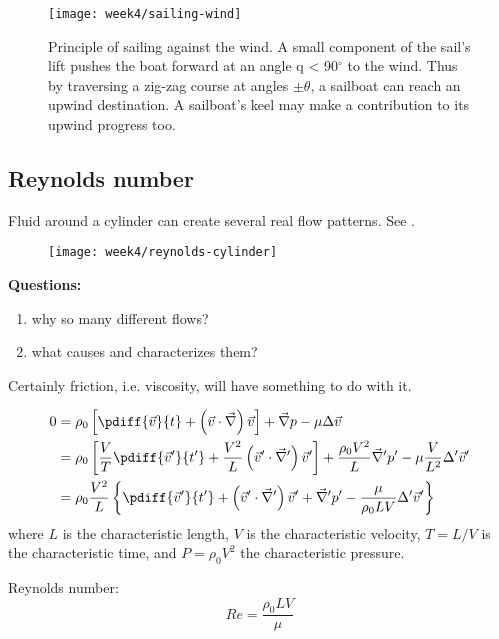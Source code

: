 \begin{figure}[!h]
    \centering
    \texttt{[image: week4/sailing-wind]}\\
    \caption{Principle of sailing against the wind. A small component of the sail’s lift pushes the boat forward at an angle q < 90$^\circ$ to the wind. Thus by traversing a zig-zag course at angles $\pm\theta$, a sailboat can reach an upwind destination. A sailboat’s keel may make a contribution to its upwind progress too.}
    \label{fig:sailing-wind}
\end{figure}

\newpage
\subsection{Reynolds number}
Fluid around a cylinder can create several real flow patterns. See .

\begin{figure}[p]
    \centering
    \texttt{[image: week4/reynolds-cylinder]}\\
    \caption{}
    \label{fig:reynolds-cylinder}
\end{figure}

\textbf{Questions:}
\begin{enumerate}
\item why so many different flows?
\item what causes and characterizes them?
\end{enumerate}
Certainly friction, i.e. viscosity, will have something to do with it.

\begin{align}
0 &= \rho_0 \left[\pdiff{\vec{v}}{t}+\left(\vec{v}\cdot\vec{\nabla}\right)\vec{v}\right] + \vec{\nabla}p - \mu\Delta \vec{v} \\
&= \rho_0\left[\frac{V}{T}\pdiff{\vec{v}'}{t'}+\frac{V^2}{L}\left(\vec{v}'\cdot\vec{\nabla}'\right)\vec{v}'\right] + \frac{\rho_0 V^2}{L}\vec{\nabla}'p'-\mu\frac{V}{L^2}\Delta'\vec{v}' \\
&= \rho_0\frac{V^2}{L} \left\lbrace \pdiff{\vec{v}'}{t'}+\left(\vec{v}'\cdot\vec{\nabla}'\right)\vec{v}'+\vec{\nabla}'p'-\frac{\mu}{\rho_0 LV} \Delta'\vec{v}' \right\rbrace
\end{align}
where $L$ is the characteristic length, $V$ is the characteristic velocity, $T=L/V$ is the characteristic time, and $P=\rho_0V^2$ the characteristic pressure.

Reynolds number:
\begin{equation}
Re = \frac{\rho_0 L V}{\mu}
\end{equation}

